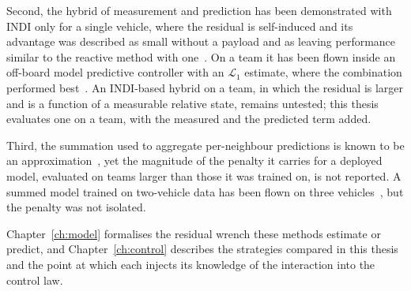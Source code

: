 Second, the hybrid of measurement and prediction has been demonstrated with INDI only for a single
vehicle, where the residual is self-induced and its advantage was described as small without a
payload and as leaving performance similar to the reactive method with
one~\cite{cobobriesewitz2026lindi}. On a team it has been flown inside an off-board model predictive
controller with an $\mathcal{L}_1$ estimate, where the combination performed
best~\cite{hsieh2025onlineadaptation}. An INDI-based hybrid on a team, in which the residual is
larger and is a function of a measurable relative state, remains untested; this thesis evaluates
one on a team, with the measured and the predicted term added.

Third, the summation used to aggregate per-neighbour predictions is known to be an
approximation~\cite{shi2020neuralswarm,gielis2023aggregate}, yet the magnitude of the penalty it
carries for a deployed model, evaluated on teams larger than those it was trained on, is not
reported. A summed model trained on two-vehicle data has been flown on three
vehicles~\cite{hsieh2025onlineadaptation}, but the penalty was not isolated.


Chapter~\ref{ch:model} formalises the residual wrench these methods estimate or predict, and
Chapter~\ref{ch:control} describes the strategies compared in this thesis and the point at
which each injects its knowledge of the interaction into the control law.
